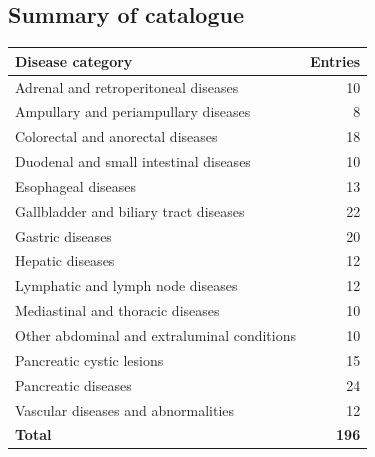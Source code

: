 \subsection{Summary of catalogue}
\begin{tabular}{@{}p{}r@{}}
\toprule
\textbf{Disease category} & \textbf{Entries} \\
\midrule
Adrenal and retroperitoneal diseases & 10 \\
Ampullary and periampullary diseases & 8 \\
Colorectal and anorectal diseases & 18 \\
Duodenal and small intestinal diseases & 10 \\
Esophageal diseases & 13 \\
Gallbladder and biliary tract diseases & 22 \\
Gastric diseases & 20 \\
Hepatic diseases & 12 \\
Lymphatic and lymph node diseases & 12 \\
Mediastinal and thoracic diseases & 10 \\
Other abdominal and extraluminal conditions & 10 \\
Pancreatic cystic lesions & 15 \\
Pancreatic diseases & 24 \\
Vascular diseases and abnormalities & 12 \\
\midrule
\textbf{Total} & \textbf{196} \\
\bottomrule
\end{tabular}

